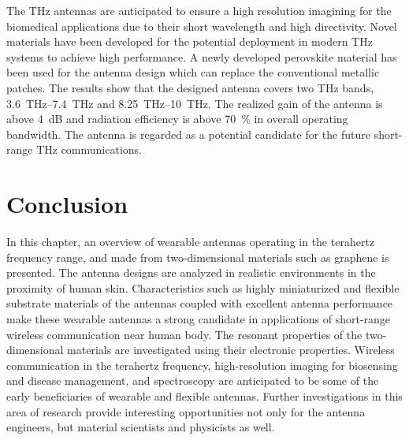 \documentclass[12pt]{suhbook}
\begin{document}
% 
The THz antennas are anticipated to ensure a high resolution imagining for the biomedical applications due to their short wavelength and high directivity. Novel materials have been developed for the potential deployment in modern THz systems to achieve high performance.  A newly developed perovskite material has been used for the antenna design which can replace the conventional metallic patches. The results show that the designed antenna covers two THz bands, \SIrange{3.6}{7.4}{\THz} and \SIrange{8.25}{10}{\THz}. The realized gain of the antenna is above \SI{4}{\dB} and radiation efficiency is above \SI{70}{\percent} in overall operating bandwidth. The antenna is regarded as a potential candidate for the future short-range THz communications.

\section{Conclusion}
In this chapter, an overview of wearable antennas operating in the terahertz frequency range, and made from two-dimensional materials such as graphene is presented. The antenna designs are analyzed in realistic environments in the proximity of human skin. Characteristics such as highly miniaturized and flexible substrate materials of the antennas coupled with excellent antenna performance make these wearable antennas a strong candidate in applications of short-range wireless communication near human body. The resonant properties of the two-dimensional materials are investigated using their electronic properties.  Wireless communication in the terahertz frequency, high-resolution imaging for biosensing and disease management, and spectroscopy are anticipated to be some of the early beneficiaries of wearable and flexible antennas. Further investigations in this area of research provide interesting opportunities not only for the antenna engineers, but material scientists and physicists as well.
% 
% 


\end{document}

